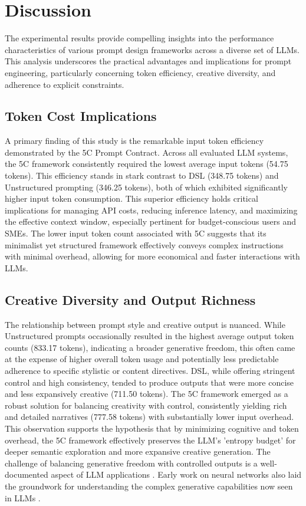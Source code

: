 \documentclass[10pt, a4paper]{article}
\begin{document}
\section{Discussion}
The experimental results provide compelling insights into the performance characteristics of various prompt design frameworks across a diverse set of LLMs. This analysis underscores the practical advantages and implications for prompt engineering, particularly concerning token efficiency, creative diversity, and adherence to explicit constraints.

\subsection{Token Cost Implications}
A primary finding of this study is the remarkable input token efficiency demonstrated by the 5C Prompt Contract. Across all evaluated LLM systems, the 5C framework consistently required the lowest average input tokens (54.75 tokens). This efficiency stands in stark contrast to DSL (348.75 tokens) and Unstructured prompting (346.25 tokens), both of which exhibited significantly higher input token consumption. This superior efficiency holds critical implications for managing API costs, reducing inference latency, and maximizing the effective context window, especially pertinent for budget-conscious users and SMEs. The lower input token count associated with 5C suggests that its minimalist yet structured framework effectively conveys complex instructions with minimal overhead, allowing for more economical and faster interactions with LLMs.

\subsection{Creative Diversity and Output Richness}
The relationship between prompt style and creative output is nuanced. While Unstructured prompts occasionally resulted in the highest average output token counts (833.17 tokens), indicating a broader generative freedom, this often came at the expense of higher overall token usage and potentially less predictable adherence to specific stylistic or content directives. DSL, while offering stringent control and high consistency, tended to produce outputs that were more concise and less expansively creative (711.50 tokens). The 5C framework emerged as a robust solution for balancing creativity with control, consistently yielding rich and detailed narratives (777.58 tokens) with substantially lower input overhead. This observation supports the hypothesis that by minimizing cognitive and token overhead, the 5C framework effectively preserves the LLM's 'entropy budget' for deeper semantic exploration and more expansive creative generation. The challenge of balancing generative freedom with controlled outputs is a well-documented aspect of LLM applications \cite{vaswani2017attention}. Early work on neural networks also laid the groundwork for understanding the complex generative capabilities now seen in LLMs \cite{hinton2012deep}.
\end{document}

